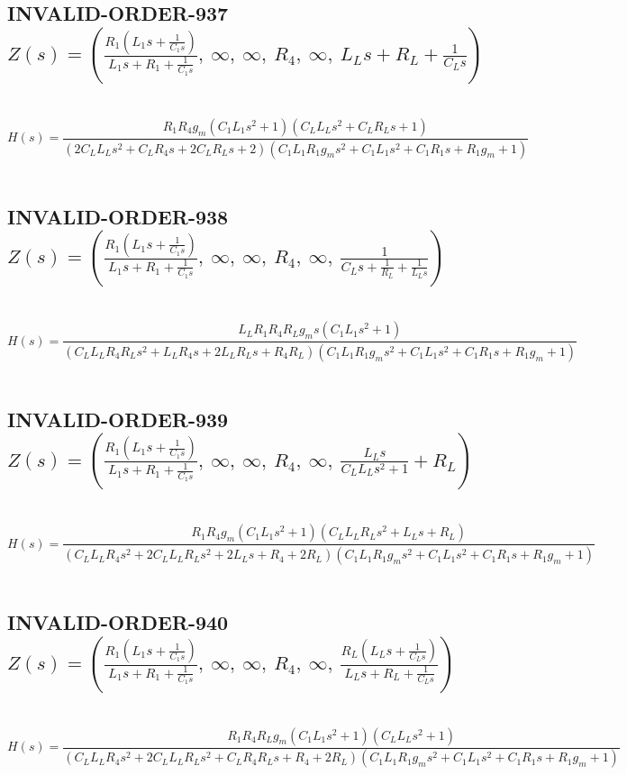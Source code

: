 \documentclass{article}
\begin{document}
\subsection{INVALID-ORDER-937 $Z(s) = \left( \frac{R_{1} \left(L_{1} s + \frac{1}{C_{1} s}\right)}{L_{1} s + R_{1} + \frac{1}{C_{1} s}}, \  \infty, \  \infty, \  R_{4}, \  \infty, \  L_{L} s + R_{L} + \frac{1}{C_{L} s}\right)$ } \ 
\textbf{\[H(s) = \frac{R_{1} R_{4} g_{m} \left(C_{1} L_{1} s^{2} + 1\right) \left(C_{L} L_{L} s^{2} + C_{L} R_{L} s + 1\right)}{\left(2 C_{L} L_{L} s^{2} + C_{L} R_{4} s + 2 C_{L} R_{L} s + 2\right) \left(C_{1} L_{1} R_{1} g_{m} s^{2} + C_{1} L_{1} s^{2} + C_{1} R_{1} s + R_{1} g_{m} + 1\right)}\] } \ 
\subsection{INVALID-ORDER-938 $Z(s) = \left( \frac{R_{1} \left(L_{1} s + \frac{1}{C_{1} s}\right)}{L_{1} s + R_{1} + \frac{1}{C_{1} s}}, \  \infty, \  \infty, \  R_{4}, \  \infty, \  \frac{1}{C_{L} s + \frac{1}{R_{L}} + \frac{1}{L_{L} s}}\right)$ } \ 
\textbf{\[H(s) = \frac{L_{L} R_{1} R_{4} R_{L} g_{m} s \left(C_{1} L_{1} s^{2} + 1\right)}{\left(C_{L} L_{L} R_{4} R_{L} s^{2} + L_{L} R_{4} s + 2 L_{L} R_{L} s + R_{4} R_{L}\right) \left(C_{1} L_{1} R_{1} g_{m} s^{2} + C_{1} L_{1} s^{2} + C_{1} R_{1} s + R_{1} g_{m} + 1\right)}\] } \ 
\subsection{INVALID-ORDER-939 $Z(s) = \left( \frac{R_{1} \left(L_{1} s + \frac{1}{C_{1} s}\right)}{L_{1} s + R_{1} + \frac{1}{C_{1} s}}, \  \infty, \  \infty, \  R_{4}, \  \infty, \  \frac{L_{L} s}{C_{L} L_{L} s^{2} + 1} + R_{L}\right)$ } \ 
\textbf{\[H(s) = \frac{R_{1} R_{4} g_{m} \left(C_{1} L_{1} s^{2} + 1\right) \left(C_{L} L_{L} R_{L} s^{2} + L_{L} s + R_{L}\right)}{\left(C_{L} L_{L} R_{4} s^{2} + 2 C_{L} L_{L} R_{L} s^{2} + 2 L_{L} s + R_{4} + 2 R_{L}\right) \left(C_{1} L_{1} R_{1} g_{m} s^{2} + C_{1} L_{1} s^{2} + C_{1} R_{1} s + R_{1} g_{m} + 1\right)}\] } \ 
\subsection{INVALID-ORDER-940 $Z(s) = \left( \frac{R_{1} \left(L_{1} s + \frac{1}{C_{1} s}\right)}{L_{1} s + R_{1} + \frac{1}{C_{1} s}}, \  \infty, \  \infty, \  R_{4}, \  \infty, \  \frac{R_{L} \left(L_{L} s + \frac{1}{C_{L} s}\right)}{L_{L} s + R_{L} + \frac{1}{C_{L} s}}\right)$ } \ 
\textbf{\[H(s) = \frac{R_{1} R_{4} R_{L} g_{m} \left(C_{1} L_{1} s^{2} + 1\right) \left(C_{L} L_{L} s^{2} + 1\right)}{\left(C_{L} L_{L} R_{4} s^{2} + 2 C_{L} L_{L} R_{L} s^{2} + C_{L} R_{4} R_{L} s + R_{4} + 2 R_{L}\right) \left(C_{1} L_{1} R_{1} g_{m} s^{2} + C_{1} L_{1} s^{2} + C_{1} R_{1} s + R_{1} g_{m} + 1\right)}\] } \ 
\end{document}
